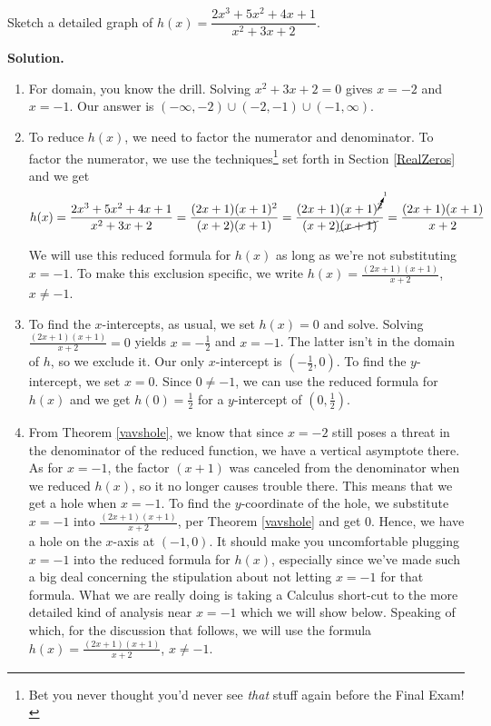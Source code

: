 \begin{ex}  Sketch a detailed graph of $h(x) = \dfrac{2x^3+5x^2+4x+1}{x^2+3x+2}$.

{ \bf Solution.}  

\begin{enumerate}

\item  For domain, you know the drill.  Solving $x^2+3x+2 = 0$ gives $x = -2$ and $x=-1$.  Our answer is $(-\infty, -2) \cup (-2, -1) \cup (-1, \infty)$.

\item  To reduce $h(x)$, we need to factor the numerator and denominator.  To factor the numerator, we use the techniques\footnote{Bet you never thought you'd never see \textit{that} stuff again before the Final Exam!} set forth in Section \ref{RealZeros} and we get  \[h(x) =  \dfrac{2x^3+5x^2+4x+1}{x^2+3x+2} = \dfrac{(2x+1)(x+1)^2}{(x+2)(x+1)} = \dfrac{ (2x+1) (x+1)^{\cancelto{1}{2}}  }{(x+2)\cancel{(x+1)}} = \dfrac{(2x+1)(x+1)}{x+2} \]

We will use this reduced formula for $h(x)$ as long as we're not substituting $x=-1$.  To make this exclusion specific, we write $h(x) = \frac{(2x+1)(x+1)}{x+2}$, $x \neq -1$.

\item  To find the $x$-intercepts, as usual, we set $h(x) = 0$ and solve.  Solving $\frac{(2x+1)(x+1)}{x+2}=0$ yields $x=-\frac{1}{2}$ and $x=-1$.  The latter isn't in the domain of $h$, so we exclude it.  Our only $x$-intercept is $\left(-\frac{1}{2}, 0\right)$.  To find the $y$-intercept, we set $x=0$.  Since $0 \neq -1$, we can use the reduced formula for $h(x)$ and we get $h(0) = \frac{1}{2}$ for a $y$-intercept of $\left(0,\frac{1}{2}\right)$.

\item  From Theorem \ref{vavshole}, we know that since $x=-2$ still poses a threat in the denominator of the reduced function, we have a vertical asymptote there.  As for $x=-1$, the factor $(x+1)$ was canceled from the denominator when we reduced $h(x)$, so it no longer causes trouble there.  This means that we get a hole when $x=-1$.  To find the $y$-coordinate of the hole, we substitute $x=-1$ into $\frac{(2x+1)(x+1)}{x+2}$, per Theorem \ref{vavshole} and get $0$.  Hence, we have a hole on the $x$-axis at $(-1,0)$.  It should make you uncomfortable plugging $x=-1$ into the reduced formula for $h(x)$, especially since we've made such a big deal concerning the stipulation about not letting $x=-1$ for that formula.  What we are really doing is taking a Calculus short-cut to the more detailed kind of analysis near $x=-1$ which we will show below.  Speaking of which, for the discussion that follows,  we will use the formula $h(x) = \frac{(2x+1)(x+1)}{x+2}$, $x \neq -1$.


\end{enumerate}
\end{ex}
